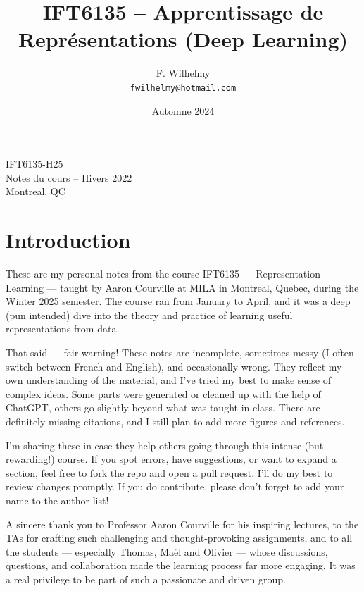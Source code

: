 \documentclass{article}
\title{IFT6135 -- Apprentissage de Représentations (Deep Learning)}
\author{F. Wilhelmy \\
    \texttt{fwilhelmy@hotmail.com}}
\date{Automne 2024}
\begin{document}
\maketitle

\begin{center}
    \huge IFT6135-H25 \\
    \Large Notes du cours -- Hivers 2022 \\
    \vspace{1cm}
    Montreal, QC \\
    \vspace{1cm}
\end{center}
\newpage



\section*{Introduction}
These are my personal notes from the course IFT6135 — Representation Learning — taught by Aaron Courville at MILA in Montreal, Quebec, during the Winter 2025 semester. The course ran from January to April, and it was a deep (pun intended) dive into the theory and practice of learning useful representations from data.

That said — fair warning! These notes are incomplete, sometimes messy (I often switch between French and English), and occasionally wrong. They reflect my own understanding of the material, and I’ve tried my best to make sense of complex ideas. Some parts were generated or cleaned up with the help of ChatGPT, others go slightly beyond what was taught in class. There are definitely missing citations, and I still plan to add more figures and references.

I’m sharing these in case they help others going through this intense (but rewarding!) course. If you spot errors, have suggestions, or want to expand a section, feel free to fork the repo and open a pull request. I’ll do my best to review changes promptly. If you do contribute, please don’t forget to add your name to the author list!

A sincere thank you to Professor Aaron Courville for his inspiring lectures, to the TAs for crafting such challenging and thought-provoking assignments, and to all the students — especially Thomas, Maël and Olivier — whose discussions, questions, and collaboration made the learning process far more engaging. It was a real privilege to be part of such a passionate and driven group.
\end{document}
